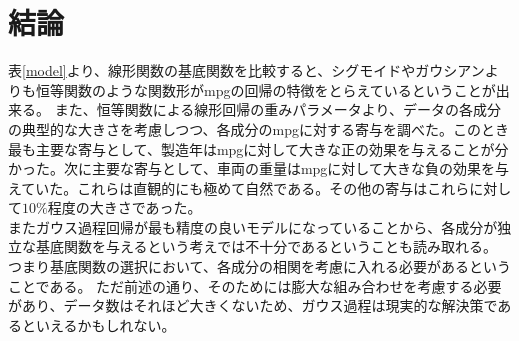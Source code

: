 \documentclass{jarticle}
\begin{document}
\section{結論}
表\ref{model}より、線形関数の基底関数を比較すると、シグモイドやガウシアンよりも恒等関数のような関数形がmpgの回帰の特徴をとらえているということが出来る。
また、恒等関数による線形回帰の重みパラメータより、データの各成分の典型的な大きさを考慮しつつ、各成分のmpgに対する寄与を調べた。このとき最も主要な寄与として、製造年はmpgに対して大きな正の効果を与えることが分かった。次に主要な寄与として、車両の重量はmpgに対して大きな負の効果を与えていた。これらは直観的にも極めて自然である。その他の寄与はこれらに対して$10\%$程度の大きさであった。\\
またガウス過程回帰が最も精度の良いモデルになっていることから、各成分が独立な基底関数を与えるという考えでは不十分であるということも読み取れる。
つまり基底関数の選択において、各成分の相関を考慮に入れる必要があるということである。
ただ前述の通り、そのためには膨大な組み合わせを考慮する必要があり、データ数はそれほど大きくないため、ガウス過程は現実的な解決策であるといえるかもしれない。
\end{document}
